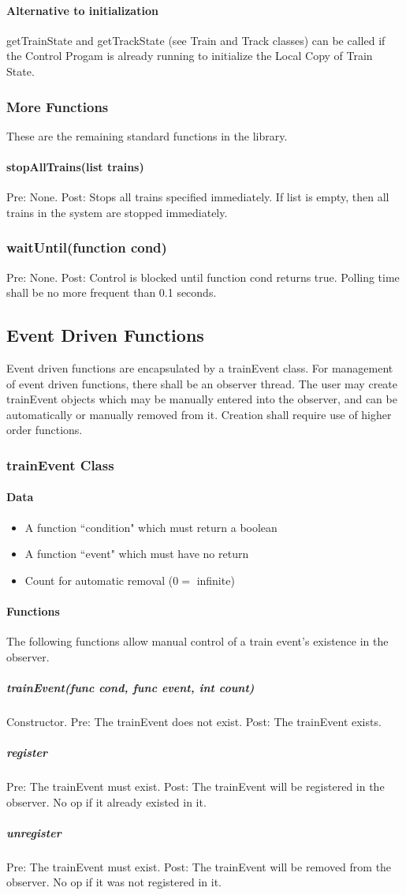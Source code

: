 \documentclass[a4paper,11pt,notitlepage]{article}
\def\CS{Control Progam\xspace} \def\LC{Local Copy of Train State\xspace} \def\TN{Track Node\xspace}
\begin{document}
\paragraph{Alternative to initialization} getTrainState and getTrackState (see Train and Track classes) can be called if the \CS is already running to initialize the \LC.
\subsubsection{More Functions}
These are the remaining standard functions in the library.
\paragraph{stopAllTrains(list trains)} Pre: None. Post: Stops all trains specified immediately. If list is empty, then all trains in the system are stopped immediately.
\subsubsection{waitUntil(function cond)} Pre: None. Post: Control is blocked until function cond returns true. Polling time shall be no more frequent than 0.1 seconds.

\subsection{Event Driven Functions}
Event driven functions are encapsulated by a trainEvent class. For management of event driven functions, there shall be an observer thread. The user may create trainEvent objects which may be manually entered into the observer, and can be automatically or manually removed from it. Creation shall require use of higher order functions.
\subsubsection{trainEvent Class}
\paragraph{Data}
\begin{itemize}
\item A function ``condition" which must return a boolean
\item A function ``event" which must have no return
\item Count for automatic removal ($0 =$ infinite)
\end{itemize}
\paragraph{Functions}
The following functions allow manual control of a train event's existence in the observer.
\subparagraph{trainEvent(func cond, func event, int count)} Constructor. Pre: The trainEvent does not exist. Post: The trainEvent exists.
\subparagraph{register} Pre: The trainEvent must exist. Post: The trainEvent will be registered in the observer. No op if it already existed in it.
\subparagraph{unregister} Pre: The trainEvent must exist. Post: The trainEvent will be removed from the observer. No op if it was not registered in it.
\end{document}
